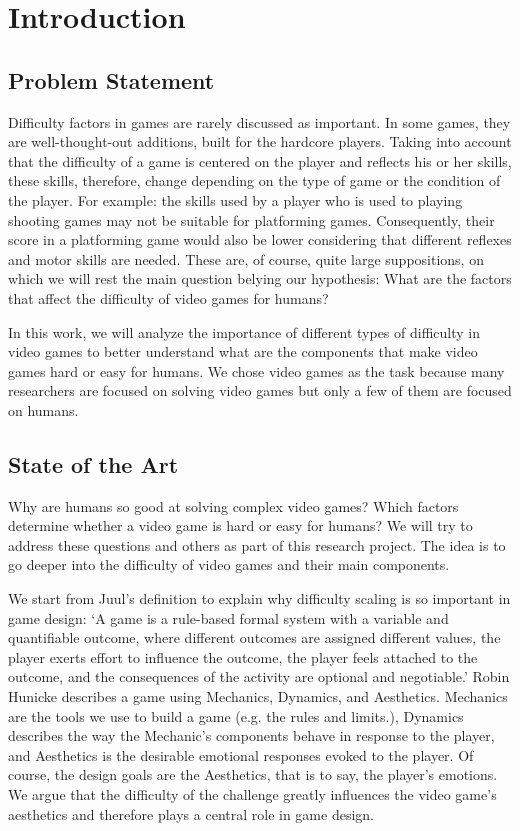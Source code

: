 \normallinespacing

\chapter{Introduction}
\section{Problem Statement}

Difficulty factors in games are rarely discussed as important. In some games, they are well-thought-out additions, built for the hardcore players. Taking into account that the difficulty of a game is centered on the player and reflects his or her skills, these skills, therefore, change depending on the type of game or the condition of the player. For example: the skills used by a player who is used to playing shooting games may not be suitable for platforming games. Consequently, their score in a platforming game would also be lower considering that different reflexes and motor skills are needed. These are, of course, quite large suppositions, on which we will rest the main question belying our hypothesis: What are the factors that affect the difficulty of video games for humans?

In this work, we will analyze the importance of different types of difficulty in video games to better understand what are the components that make video games hard or easy for humans. We chose video games as the task because many researchers are focused on solving video games but only a few of them are focused on humans. \cite{Dubey2018HumanPriors}

\section{State of the Art}
Why are humans so good at solving complex video games? Which factors determine whether a video game is hard or easy for humans? We will try to address these questions and others as part of this research project. The idea is to go deeper into the difficulty of video games and their main components.  \cite{Dubey2018HumanPriors}

We start from Juul’s definition to explain why difficulty scaling is so important in game design: ‘A game is a rule-based formal system with a variable and quantifiable outcome, where different outcomes are assigned different values, the player exerts effort to influence the outcome, the player feels attached to the outcome, and the consequences of the activity are optional and negotiable.’ \cite{Aponte2009MeasuringDif}
Robin Hunicke describes a game using Mechanics, Dynamics, and Aesthetics. Mechanics are the tools we use to build a game (e.g. the rules and limits.), Dynamics describes the way the Mechanic’s components behave in response to the player, and Aesthetics is the desirable emotional responses evoked to the player. Of course, the design goals are the Aesthetics, that is to say, the player’s emotions. We argue that the difficulty of the challenge greatly influences the video game’s aesthetics and therefore plays a central role in game design. \cite{Aponte2009MeasuringDif}

